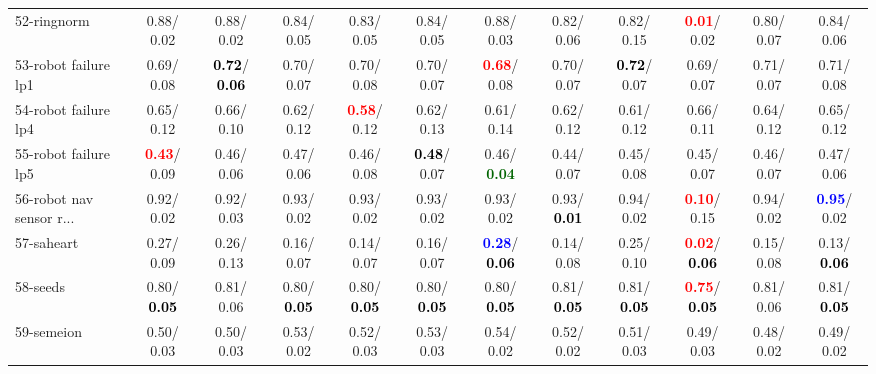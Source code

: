 \begin{table}[h]
\begin{center}
{\begin{tabular}{lc|c|c|c|c|c|c|c|c|c|c}
52-ringnorm &   0.88/  0.02 &   0.88/  0.02 &   0.84/  0.05 &   0.83/  0.05 &   0.84/  0.05 &   0.88/  0.03 &   0.82/  0.06 &   0.82/  0.15 & \textcolor{red}{\textbf{  0.01}}/  0.02 &   0.80/  0.07 &   0.84/  0.06 \\
53-robot failure lp1 &   0.69/  0.08 & \textcolor{black}{\textbf{  0.72}}/\textcolor{black}{\textbf{  0.06}} &   0.70/  0.07 &   0.70/  0.08 &   0.70/  0.07 & \textcolor{red}{\textbf{  0.68}}/  0.08 &   0.70/  0.07 & \textcolor{black}{\textbf{  0.72}}/  0.07 &   0.69/  0.07 &   0.71/  0.07 &   0.71/  0.08 \\ \hline
54-robot failure lp4 &   0.65/  0.12 &   0.66/  0.10 &   0.62/  0.12 & \textcolor{red}{\textbf{  0.58}}/  0.12 &   0.62/  0.13 &   0.61/  0.14 &   0.62/  0.12 &   0.61/  0.12 &   0.66/  0.11 &   0.64/  0.12 &   0.65/  0.12 \\
55-robot failure lp5 & \textcolor{red}{\textbf{  0.43}}/  0.09 &   0.46/  0.06 &   0.47/  0.06 &   0.46/  0.08 & \textcolor{black}{\textbf{  0.48}}/  0.07 &   0.46/\textcolor{darkgreen}{\textbf{  0.04}} &   0.44/  0.07 &   0.45/  0.08 &   0.45/  0.07 &   0.46/  0.07 &   0.47/  0.06 \\
56-robot nav sensor r... &   0.92/  0.02 &   0.92/  0.03 &   0.93/  0.02 &   0.93/  0.02 &   0.93/  0.02 &   0.93/  0.02 &   0.93/\textcolor{black}{\textbf{  0.01}} &   0.94/  0.02 & \textcolor{red}{\textbf{  0.10}}/  0.15 &   0.94/  0.02 & \textcolor{blue}{\textbf{  0.95}}/  0.02 \\
57-saheart &   0.27/  0.09 &   0.26/  0.13 &   0.16/  0.07 &   0.14/  0.07 &   0.16/  0.07 & \textcolor{blue}{\textbf{  0.28}}/\textcolor{black}{\textbf{  0.06}} &   0.14/  0.08 &   0.25/  0.10 & \textcolor{red}{\textbf{  0.02}}/\textcolor{black}{\textbf{  0.06}} &   0.15/  0.08 &   0.13/\textcolor{black}{\textbf{  0.06}} \\
58-seeds &   0.80/\textcolor{black}{\textbf{  0.05}} &   0.81/  0.06 &   0.80/\textcolor{black}{\textbf{  0.05}} &   0.80/\textcolor{black}{\textbf{  0.05}} &   0.80/\textcolor{black}{\textbf{  0.05}} &   0.80/\textcolor{black}{\textbf{  0.05}} &   0.81/\textcolor{black}{\textbf{  0.05}} &   0.81/\textcolor{black}{\textbf{  0.05}} & \textcolor{red}{\textbf{  0.75}}/\textcolor{black}{\textbf{  0.05}} &   0.81/  0.06 &   0.81/\textcolor{black}{\textbf{  0.05}} \\
59-semeion &   0.50/  0.03 &   0.50/  0.03 &   0.53/  0.02 &   0.52/  0.03 &   0.53/  0.03 &   0.54/  0.02 &   0.52/  0.02 &   0.51/  0.03 &   0.49/  0.03 &   0.48/  0.02 &   0.49/  0.02 \\

\end{tabular}}
\end{center}
\end{table}
